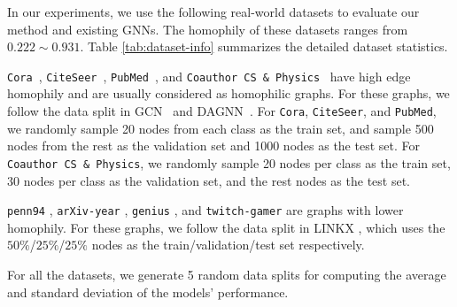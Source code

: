 \documentclass{article}
\theoremstyle{plain}
\begin{document}
In our experiments, we use the following real-world datasets to evaluate our method and existing GNNs. The homophily of these datasets ranges from $0.222 \sim 0.931$. Table \ref{tab:dataset-info} summarizes the detailed dataset statistics. 

\texttt{Cora}~\cite{sen2008collective}, \texttt{CiteSeer}~\cite{sen2008collective}, \texttt{PubMed}~\cite{sen2008collective}, and \texttt{Coauthor CS \& Physics}~\cite{shchur2018pitfalls} have high edge homophily and are usually considered as homophilic graphs. For these graphs, we follow the data split in GCN~\cite{kipf2016semi} and DAGNN~\cite{liu2020towards}. For \texttt{Cora}, \texttt{CiteSeer}, and \texttt{PubMed}, we randomly sample 20 nodes from each class as the train set, and sample 500 nodes from the rest as the validation set and 1000 nodes as the test set. For \texttt{Coauthor CS \& Physics}, we randomly sample 20 nodes per class as the train set, 30 nodes per class as the validation set, and the rest nodes as the test set.

\texttt{penn94} \cite{traud2012social}, \texttt{arXiv-year} \cite{hu2020open}, \texttt{genius} \cite{lim2021expertise}, and \texttt{twitch-gamer} \cite{rozemberczki2021twitch} are graphs with lower homophily. For these graphs, we follow the data split in LINKX \cite{lim2021new,lim2021large}, which uses the $50\%$/$25\%$/$25\%$ nodes as the train/validation/test set respectively.

For all the datasets, we generate 5 random data splits for computing the average and standard deviation of the models' performance. 
\end{document}
